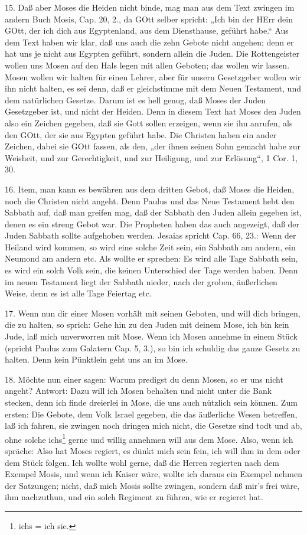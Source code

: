 15. Daß aber Moses die Heiden nicht binde, mag man aus dem Text zwingen im andern Buch Mosis, Cap. 20, 2., da GOtt selber spricht: „Ich bin der HErr dein GOtt, der ich dich aus Egyptenland, aus dem Diensthause, geführt habe.“ Aus dem Text haben wir klar, daß uns auch die zehn Gebote nicht angehen; denn er hat uns je nicht aus Egypten geführt, sondern allein die Juden. Die Rottengeister wollen uns Mosen auf den Hals legen mit allen Geboten; das wollen wir lassen. Mosen wollen wir halten für einen Lehrer, aber für unsern Gesetzgeber wollen wir ihn nicht halten, es sei denn, daß er gleichstimme mit dem Neuen Testament, und dem natürlichen Gesetze. Darum ist es hell genug, daß Moses der Juden Gesetzgeber ist, und nicht der Heiden. Denn in diesem Text hat Moses den Juden also ein Zeichen gegeben, daß sie Gott sollen erzeigen, wenn sie ihn anrufen, als den GOtt, der sie aus Egypten geführt habe. Die Christen haben ein ander Zeichen, dabei sie GOtt fassen, als den, „der ihnen seinen Sohn gemacht habe zur Weisheit, und zur Gerechtigkeit, und zur Heiligung, und zur Erlösung“, 1 Cor. 1, 30.

16. Item, man kann es bewähren aus dem dritten Gebot, daß Moses die Heiden, noch die Christen nicht angeht. Denn Paulus und das Neue Testament hebt den Sabbath auf, daß man greifen mag, daß der Sabbath den Juden allein gegeben ist, denen es ein streng Gebot war. Die Propheten haben das auch angezeigt, daß der Juden Sabbath sollte aufgehoben werden. Jesaias spricht Cap. 66, 23.: Wenn der Heiland wird kommen, so wird eine solche Zeit sein, ein Sabbath am andern, ein Neumond am andern etc. Als wollte er sprechen: Es wird alle Tage Sabbath sein, es wird ein solch Volk sein, die keinen Unterschied der Tage werden haben. Denn im neuen Testament liegt der Sabbath nieder, nach der groben, äußerlichen Weise, denn es ist alle Tage Feiertag etc.

17. Wenn nun dir einer Mosen vorhält mit seinen Geboten, und will dich bringen, die zu halten, so sprich: Gehe hin zu den Juden mit deinem Mose, ich bin kein Jude, laß mich unverworren mit Mose. Wenn ich Mosen annehme in einem Stück (spricht Paulus zum Galatern Cap. 5, 3.), so bin ich schuldig das ganze Gesetz zu halten. Denn kein Pünktlein geht uns an im Mose.

18. Möchte nun einer sagen: Warum predigst du denn Mosen, so er uns nicht angeht? Antwort: Dazu will ich Mosen behalten und nicht unter die Bank stecken, denn ich finde dreierlei in Mose, die uns auch nützlich sein können. Zum ersten: Die Gebote, dem Volk Israel gegeben, die das äußerliche Wesen betreffen, laß ich fahren, sie zwingen noch dringen mich nicht, die Gesetze sind todt und ab, ohne solche ichs\footnote{ichs = ich sie.} gerne und willig annehmen will aus dem Mose. Also, wenn ich spräche: Also hat Moses regiert, es dünkt mich sein fein, ich will ihm in dem oder dem Stück folgen. Ich wollte wohl gerne, daß die Herren regierten nach dem Exempel Mosis, und wenn ich Kaiser wäre, wollte ich daraus ein Exempel nehmen der Satzungen; nicht, daß mich Mosis sollte zwingen, sondern daß mir’s frei wäre, ihm nachzuthun, und ein solch Regiment zu führen, wie er regieret hat.

